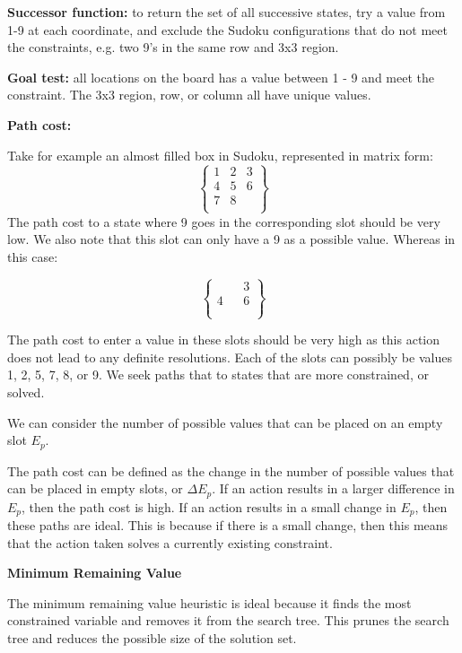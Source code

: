 \textbf{Successor function:} to return the set of all successive states, try a value from 1-9 at each coordinate, and exclude the Sudoku configurations that do not meet the constraints, e.g. two 9's in the same row and 3x3 region.

\textbf{Goal test:} all locations on the board has a value between 1 - 9 and meet the constraint. The 3x3 region, row, or column all have unique values. 

\textbf{Path cost:} 

Take for example an almost filled box in Sudoku, represented in matrix form:
\[
\begin{Bmatrix}
	1 & 2 & 3 \\
	4 & 5 & 6 \\
	7 & 8 &  \\	
\end{Bmatrix}
\]
The path cost to a state where 9 goes in the corresponding slot should be very low. We also note that this slot can only have a 9 as a possible value. Whereas in this case:

\[
\begin{Bmatrix}
 &  & 3 \\
4 &  & 6 \\
 &  &  \\	
\end{Bmatrix}
\]

The path cost to enter a value in these slots should be very high as this action does not lead to any definite resolutions. Each of the slots can possibly be values 1, 2, 5, 7, 8, or 9. We seek paths that to states that are more constrained, or solved.

We can consider the number of possible values that can be placed on an empty slot $E_p$.

The path cost can be defined as the change in the number of possible values that can be placed in empty slots, or $\Delta E_p$. If an action results in a larger difference in $E_p$, then the path cost is high. If an action results in a small change in $E_p$, then these paths are ideal. This is because if there is a small change, then this means that the action taken solves a currently existing constraint.


\textbf{Minimum Remaining Value}


The minimum remaining value heuristic is ideal because it finds the most constrained variable and removes it from the search tree. This prunes the search tree and reduces the possible size of the solution set.

